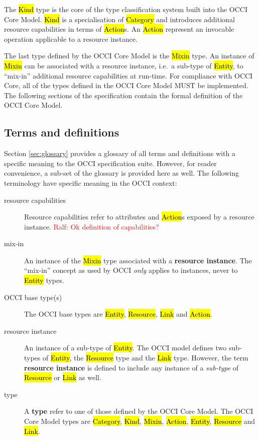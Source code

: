 \documentclass[10pt,a4paper]{article}
\newcommand{\ralf}[1]{\textcolor{red}{Ralf: #1}}
\begin{document}
The \hl{Kind} type is the core of the type classification
system built into the OCCI Core Model. \hl{Kind} is a specialisation of
\hl{Category} and introduces additional resource capabilities in terms of \hl{Action}s.
An \hl{Action} represent an invocable operation applicable to a resource
instance.

The last type defined by the OCCI Core Model is the \hl{Mixin} type. An instance of
\hl{Mixin} can be associated with a resource instance, i.e.~a sub-type of
\hl{Entity}, to ``mix-in'' additional resource capabilities at run-time.
%
For compliance with OCCI Core, all of the types defined in the OCCI Core Model MUST
be implemented.  The following sections of the specification contain the formal
definition of the OCCI Core Model.

\subsection{Terms and definitions}
Section \ref{sec:glossary} provides a glossary of all terms and definitions with
a specific meaning to the OCCI specification suite. However, for reader
convenience, a sub-set of the glossary is provided here as well. The following
terminology have specific meaning in the OCCI context:
\begin{description}
\item[resource capabilities] Resource capabilities refer to attributes and
 \hl{Action}s exposed by a resource instance.
\ralf{Ok definition of capabilities?}
\item[mix-in] An instance of the \hl{Mixin} type associated with a {\bf resource
 instance}. The ``mix-in'' concept as used by OCCI {\em only} applies to
 instances, never to \hl{Entity} types.
\item[OCCI base type(s)] The OCCI base types are \hl{Entity}, \hl{Resource},
 \hl{Link} and \hl{Action}.
\item[resource instance] An instance of a sub-type of \hl{Entity}. The OCCI
 model defines two sub-types of \hl{Entity}, the \hl{Resource} type and the
 \hl{Link} type.  However, the term {\bf resource instance} is defined to
 include any instance of a {\em sub-type} of \hl{Resource} or \hl{Link} as
 well.
\item[type] A {\bf type} refer to one of those defined by the OCCI Core Model.
The OCCI Core Model types are \hl{Category}, \hl{Kind}, \hl{Mixin}, \hl{Action},
\hl{Entity}, \hl{Resource} and \hl{Link}.
\end{description}
\end{document}
